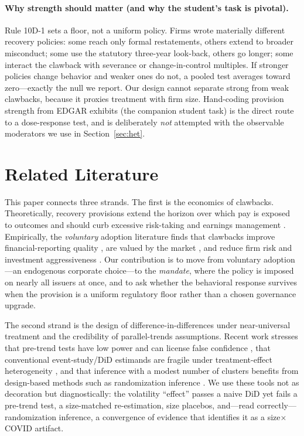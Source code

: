 \documentclass[12pt]{article}
\begin{document}
\paragraph{Why strength should matter (and why the student's task is pivotal).} Rule 10D-1 sets
a floor, not a uniform policy. Firms wrote materially different recovery policies: some reach
only formal restatements, others extend to broader misconduct; some use the statutory
three-year look-back, others go longer; some interact the clawback with severance or
change-in-control multiples. If stronger policies change behavior and weaker ones do not, a
pooled test averages toward zero---exactly the null we report. Our design cannot separate strong
from weak clawbacks, because it proxies treatment with firm size. Hand-coding provision strength
from EDGAR exhibits (the companion student task) is the direct route to a dose-response test,
and is deliberately \emph{not} attempted with the observable moderators we use in
Section~\ref{sec:het}.

\section{Related Literature}\label{sec:lit}
This paper connects three strands. The first is the economics of clawbacks. Theoretically,
recovery provisions extend the horizon over which pay is exposed to outcomes and should curb
excessive risk-taking and earnings management \citep{coles2006}. Empirically, the
\emph{voluntary} adoption literature finds that clawbacks improve financial-reporting quality
\citep{dehaan2013,chan2012}, are valued by the market \citep{iskandar2013,chen2015}, and reduce
firm risk and investment aggressiveness \citep{liu2020,babenko2023}. Our contribution is to move
from voluntary adoption---an endogenous corporate choice---to the \emph{mandate}, where the
policy is imposed on nearly all issuers at once, and to ask whether the behavioral response
survives when the provision is a uniform regulatory floor rather than a chosen governance
upgrade.

The second strand is the design of difference-in-differences under near-universal treatment and
the credibility of parallel-trends assumptions. Recent work stresses that pre-trend tests have
low power and can license false confidence \citep{roth2022}, that conventional
event-study/DiD estimands are fragile under treatment-effect heterogeneity
\citep{callaway2021}, and that inference with a modest number of clusters benefits from
design-based methods such as randomization inference \citep{young2019}. We use these tools not
as decoration but diagnostically: the volatility ``effect'' passes a naive DiD yet fails a
pre-trend test, a size-matched re-estimation, size placebos, and---read correctly---randomization
inference, a convergence of evidence that identifies it as a size$\times$COVID artifact.
\end{document}
